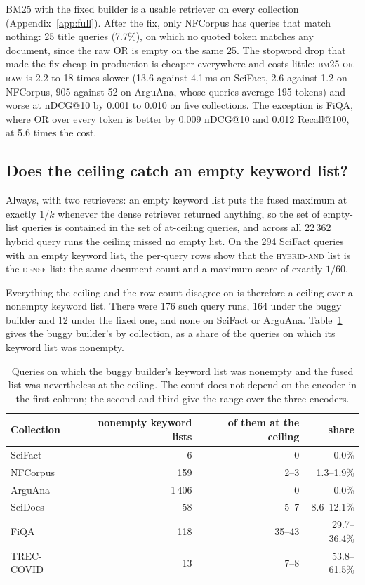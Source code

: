 \documentclass[11pt]{article}
\begin{document}
BM25 with the fixed builder is a usable retriever on every collection (Appendix~\ref{app:full}). After the fix, only NFCorpus has queries that match nothing: 25 title queries (7.7\%), on which no quoted token matches any document, since the raw OR is empty on the same 25. The stopword drop that made the fix cheap in production is cheaper everywhere and costs little: \textsc{bm25-or-raw} is 2.2 to 18 times slower (13.6 against 4.1\,ms on SciFact, 2.6 against 1.2 on NFCorpus, 905 against 52 on ArguAna, whose queries average 195 tokens) and worse at nDCG@10 by 0.001 to 0.010 on five collections. The exception is FiQA, where OR over every token is better by 0.009 nDCG@10 and 0.012 Recall@100, at 5.6 times the cost.

\subsection{Does the ceiling catch an empty keyword list?}
\label{sec:rowcount}

Always, with two retrievers: an empty keyword list puts the fused maximum at exactly $1/k$ whenever the dense retriever returned anything, so the set of empty-list queries is contained in the set of at-ceiling queries, and across all 22\,362 hybrid query runs the ceiling missed no empty list. On the 294 SciFact queries with an empty keyword list, the per-query rows show that the \textsc{hybrid-and} list is the \textsc{dense} list: the same document count and a maximum score of exactly $1/60$.

Everything the ceiling and the row count disagree on is therefore a ceiling over a nonempty keyword list. There were 176 such query runs, 164 under the buggy builder and 12 under the fixed one, and none on SciFact or ArguAna. Table~\ref{tab:excess} gives the buggy builder's by collection, as a share of the queries on which its keyword list was nonempty.

\begin{table}[h]
\centering
\small
\begin{tabular}{lrrr}
\toprule
Collection & nonempty keyword lists & of them at the ceiling & share \\
\midrule
SciFact & 6 & 0 & 0.0\% \\
NFCorpus & 159 & 2--3 & 1.3--1.9\% \\
ArguAna & 1\,406 & 0 & 0.0\% \\
SciDocs & 58 & 5--7 & 8.6--12.1\% \\
FiQA & 118 & 35--43 & 29.7--36.4\% \\
TREC-COVID & 13 & 7--8 & 53.8--61.5\% \\
\bottomrule
\end{tabular}
\caption{Queries on which the buggy builder's keyword list was nonempty and the fused list was nevertheless at the ceiling. The count does not depend on the encoder in the first column; the second and third give the range over the three encoders.}
\label{tab:excess}
\end{table}
\end{document}
